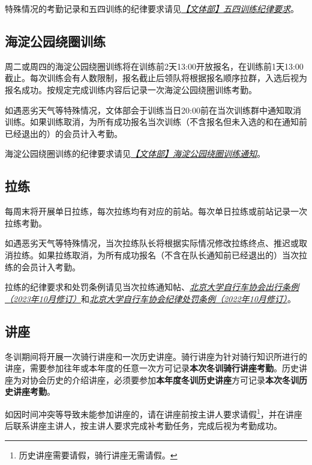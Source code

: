 \documentclass[UTF8]{ctexart}
\begin{document}
特殊情况的考勤记录和五四训练的纪律要求请见\href{https://chexie.net/bbs/content/index.php?bid=1\&tid=9576\&p=1}{\textit{【文体部】五四训练纪律要求}}。


\subsection{海淀公园绕圈训练}

周二或周四的海淀公园绕圈训练将在训练前2天13:00开放报名，在训练前1天13:00截止。每次训练会有人数限制，报名截止后领队将根据报名顺序拉群，入选后视为报名成功。按规定完成训练内容后记录一次海淀公园绕圈训练考勤。

如遇恶劣天气等特殊情况，文体部会于训练当日20:00前在当次训练群中通知取消训练。如果训练取消，为所有成功报名当次训练（不含报名但未入选的和在通知前已经退出的）的会员计入考勤。

海淀公园绕圈训练的纪律要求请见\href{https://chexie.net/bbs/content/?bid=1&tid=9615&p=1}{\textit{【文体部】海淀公园绕圈训练通知}}。

\subsection{拉练}

每周末将开展单日拉练，每次拉练均有对应的前站。每次单日拉练或前站记录一次拉练考勤。

如遇恶劣天气等特殊情况，当次拉练队长将根据实际情况修改拉练终点、推迟或取消拉练。如果拉练取消，为所有成功报名（不含在队长通知前已经退出的）当次拉练的会员计入考勤。

拉练的纪律要求和处罚条例请见当次拉练通知帖、\href{https://chexie.net/bbs/content/?bid=1&tid=9618&p=1}{\textit{北京大学自行车协会出行条例（2023年10月修订）}}和\href{https://chexie.net/bbs/content/?bid=1&tid=9260&p=1}{\textit{北京大学自行车协会纪律处罚条例（2022年10月修订）}}。

\subsection{讲座}


冬训期间将开展一次骑行讲座和一次历史讲座。骑行讲座为针对骑行知识所进行的讲座，需要参加往年或本年度的任意一次方可记录\textbf{本次冬训骑行讲座考勤}。历史讲座为对协会历史的介绍讲座，必须要参加\textbf{本年度冬训历史讲座}方可记录\textbf{本次冬训历史讲座考勤}。

如因时间冲突等导致未能参加讲座的，请在讲座前按主讲人要求请假\footnote{历史讲座需要请假，骑行讲座无需请假。}，并在讲座后联系讲座主讲人，按主讲人要求完成补考勤任务，完成后视为考勤成功。
\end{document}
